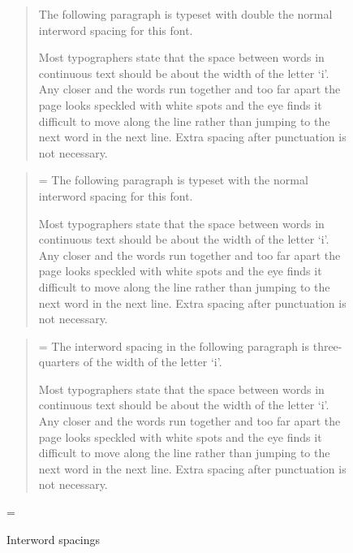 \documentclass[10pt,a4paper,oneside,extrafontsizes]{memoir}%
\begin{document}
\setlength{\unitlength}{\fontdimen2\font}
\begin{figure}
\centering
\begin{minipage}{\textwidth}
\mbox{}\hrulefill\mbox{}
\begin{quotation}
\font
    The following paragraph is typeset with double the normal interword 
spacing for this font.

    Most typographers state that the space between words in continuous
text should be about the width of the letter `i'. Any closer and the
words run together and too far apart the page looks speckled with white
spots and the eye finds it difficult to move along the line rather than
jumping to the next word in the next line. 
Extra spacing after punctuation is not necessary.
\end{quotation}
\begin{quotation}
\font=\unitlength
    The following paragraph is typeset with the normal interword spacing 
for this font.

    Most typographers state that the space between words in continuous
text should be about the width of the letter `i'. Any closer and the
words run together and too far apart the page looks speckled with white
spots and the eye finds it difficult to move along the line rather than
jumping to the next word in the next line. 
Extra spacing after punctuation is not necessary.
\end{quotation}
\begin{quotation}
\settowidth{\unitlength}{i}
\setlength{\unitlength}{0.75\unitlength}
\font=\unitlength
    The interword spacing in the following paragraph is three-quarters of
the width of the letter `i'.
 
    Most typographers state that the space between words in continuous
text should be about the width of the letter `i'. Any closer and the
words run together and too far apart the page looks speckled with white
spots and the eye finds it difficult to move along the line rather than
jumping to the next word in the next line. 
Extra spacing after punctuation is not necessary.
\end{quotation}
\mbox{}\hrulefill\mbox{}
\end{minipage}
\font=\unitlength \setlength{\unitlength}{1pt}
\caption{Interword spacings}\label{fig:interword}
\end{figure}
\end{document}
